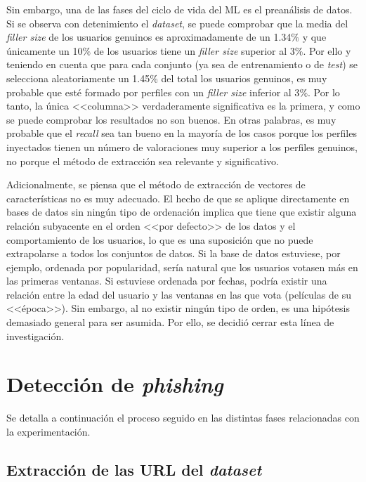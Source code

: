 Sin embargo, una de las fases del ciclo de vida del ML es el preanálisis de datos. Si se observa con detenimiento el \textit{dataset}, se puede comprobar que la media del \textit{filler size} de los usuarios genuinos es aproximadamente de un 1.34$\%$ y que únicamente un 10$\%$ de los usuarios tiene un \textit{filler size} superior al 3$\%$. Por ello y teniendo en cuenta que para cada conjunto (ya sea de entrenamiento o de \textit{test}) se selecciona aleatoriamente un 1.45\% del total los usuarios genuinos, es muy probable que esté formado por perfiles con un \textit{filler size} inferior al 3$\%$. Por lo tanto, la única <<columna>> verdaderamente significativa es la primera, y como se puede comprobar los resultados no son buenos. En otras palabras, es muy probable que el \textit{recall} sea tan bueno en la mayoría de los casos porque los perfiles inyectados tienen un número de valoraciones muy superior a los perfiles genuinos, no porque el método de extracción sea relevante y significativo.

Adicionalmente, se piensa que el método de extracción de vectores de características no es muy adecuado. El hecho de que se aplique directamente en bases de datos sin ningún tipo de ordenación implica que tiene que existir alguna relación subyacente en el orden <<por defecto>> de los datos y el comportamiento de los usuarios, lo que es una suposición que no puede extrapolarse a todos los conjuntos de datos. Si la base de datos estuviese, por ejemplo, ordenada por popularidad, sería natural que los usuarios votasen más en las primeras ventanas. Si estuviese ordenada por fechas, podría existir una relación entre la edad del usuario y las ventanas en las que vota (películas de su <<época>>). Sin embargo, al no existir ningún tipo de orden, es una hipótesis demasiado general para ser asumida. Por ello, se decidió cerrar esta línea de investigación.


\section{Detección de \textit{phishing}}
\label{sec:5_phishing}
Se detalla a continuación el proceso seguido en las distintas fases relacionadas con la experimentación.

\subsection{Extracción de las URL del \textit{dataset}}
\label{ss:extracción-dataset-phishing}

